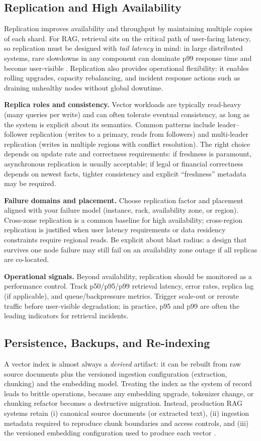 \subsection{Replication and High Availability}
Replication improves availability and throughput by maintaining multiple copies of each shard. For RAG, retrieval sits on the critical path of user-facing latency, so replication must be designed with \emph{tail latency} in mind: in large distributed systems, rare slowdowns in any component can dominate p99 response time and become user-visible \cite{Dean2013TailAtScale}. Replication also provides operational flexibility: it enables rolling upgrades, capacity rebalancing, and incident response actions such as draining unhealthy nodes without global downtime.

\textbf{Replica roles and consistency.} Vector workloads are typically read-heavy (many queries per write) and can often tolerate eventual consistency, as long as the system is explicit about its semantics. Common patterns include leader--follower replication (writes to a primary, reads from followers) and multi-leader replication (writes in multiple regions with conflict resolution). The right choice depends on update rate and correctness requirements: if freshness is paramount, asynchronous replication is usually acceptable; if legal or financial correctness depends on newest facts, tighter consistency and explicit ``freshness'' metadata may be required.

\textbf{Failure domains and placement.} Choose replication factor and placement aligned with your failure model (instance, rack, availability zone, or region). Cross-zone replication is a common baseline for high availability; cross-region replication is justified when user latency requirements or data residency constraints require regional reads. Be explicit about blast radius: a design that survives one node failure may still fail on an availability zone outage if all replicas are co-located.

\textbf{Operational signals.} Beyond availability, replication should be monitored as a performance control. Track p50/p95/p99 retrieval latency, error rates, replica lag (if applicable), and queue/backpressure metrics. Trigger scale-out or reroute traffic before user-visible degradation; in practice, p95 and p99 are often the leading indicators for retrieval incidents.

\subsection{Persistence, Backups, and Re-indexing}
A vector index is almost always a \emph{derived} artifact: it can be rebuilt from raw source documents plus the versioned ingestion configuration (extraction, chunking) and the embedding model. Treating the index as the system of record leads to brittle operations, because any embedding upgrade, tokenizer change, or chunking refactor becomes a destructive migration. Instead, production RAG systems retain (i) canonical source documents (or extracted text), (ii) ingestion metadata required to reproduce chunk boundaries and access controls, and (iii) the versioned embedding configuration used to produce each vector \cite{Kleppmann2017DDIA}.

